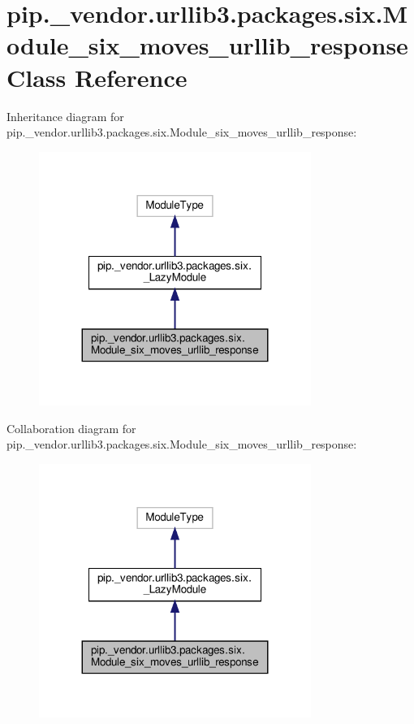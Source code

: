 \hypertarget{classpip_1_1__vendor_1_1urllib3_1_1packages_1_1six_1_1Module__six__moves__urllib__response}{}\section{pip.\+\_\+vendor.\+urllib3.\+packages.\+six.\+Module\+\_\+six\+\_\+moves\+\_\+urllib\+\_\+response Class Reference}
\label{classpip_1_1__vendor_1_1urllib3_1_1packages_1_1six_1_1Module__six__moves__urllib__response}


Inheritance diagram for pip.\+\_\+vendor.\+urllib3.\+packages.\+six.\+Module\+\_\+six\+\_\+moves\+\_\+urllib\+\_\+response\+:
\nopagebreak
\begin{figure}[H]
\begin{center}
\leavevmode
\includegraphics[width=251pt]{classpip_1_1__vendor_1_1urllib3_1_1packages_1_1six_1_1Module__six__moves__urllib__response__inherit__graph}
\end{center}
\end{figure}


Collaboration diagram for pip.\+\_\+vendor.\+urllib3.\+packages.\+six.\+Module\+\_\+six\+\_\+moves\+\_\+urllib\+\_\+response\+:
\nopagebreak
\begin{figure}[H]
\begin{center}
\leavevmode
\includegraphics[width=251pt]{classpip_1_1__vendor_1_1urllib3_1_1packages_1_1six_1_1Module__six__moves__urllib__response__coll__graph}
\end{center}
\end{figure}
